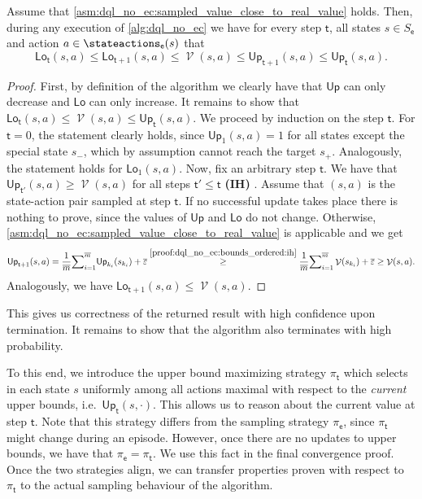 \documentclass{article}
\makeatletter
\newcommand{\States}{S}
\newcommand{\strategy}{\pi}
\DeclareMathOperator{\val}{\mathcal{V}}
\newcommand{\upperbound}{\mathsf{Up}}
\newcommand{\lowerbound}{\mathsf{Lo}}
\newcommand{\targetstate}{s_+}
\newcommand{\sinkstate}{s_-}
\newcommand{\updatestep}{{\overline{\varepsilon}}}
\newcommand{\delay}{{\overline{m}}}
\newcommand{\algostep}{\mathsf{t}}
\newcommand{\algoepisode}{\mathsf{e}}
\def\alabel#1#2{\begingroup
	\textbf{(#2)}\def\@currentlabel{\textbf{[#2]}}\phantomsection\label{#1}\endgroup
}
\makeatother
\begin{document}
\begin{lemma} \label{stm:dql_no_ec:bounds_ordered}
	Assume that \cref{asm:dql_no_ec:sampled_value_close_to_real_value} holds.
	Then, during any execution of \cref{alg:dql_no_ec} we have for every step $\algostep$, all states $s \in \States_\algoepisode$ and action $a \in \stateactions_\algoepisode(s)$ that
	\begin{equation*}
		\lowerbound_\algostep(s, a) \leq \lowerbound_{\algostep + 1}(s, a) \leq \val(s, a) \leq \upperbound_{\algostep + 1}(s, a) \leq \upperbound_\algostep(s, a).
	\end{equation*}
\end{lemma}

\begin{proof}
	First, by definition of the algorithm we clearly have that $\upperbound$ can only decrease and $\lowerbound$ can only increase.
	It remains to show that $\lowerbound_\algostep(s, a) \leq \val(s, a) \leq \upperbound_\algostep(s, a)$.
	We proceed by induction on the step $\algostep$.
	For $\algostep = 0$, the statement clearly holds, since $\upperbound_1(s, a) = 1$ for all states except the special state $\sinkstate$, which by assumption cannot reach the target $\targetstate$.
	Analogously, the statement holds for $\lowerbound_1(s, a)$.
	Now, fix an arbitrary step $\algostep$.
	We have that $\upperbound_{\algostep'}(s, a) \geq \val(s, a)$ for all steps $\algostep' \leq \algostep$ \alabel{proof:dql_no_ec:bounds_ordered:ih}{IH}.
	Assume that $(s, a)$ is the state-action pair sampled at step $\algostep$.
	If no successful update takes place there is nothing to prove, since the values of $\upperbound$ and $\lowerbound$ do not change.
	Otherwise, \cref{asm:dql_no_ec:sampled_value_close_to_real_value} is applicable and we get
	\begin{equation*}
		\upperbound_{\algostep + 1}(s, a) = \frac{1}{\delay} {\sum}_{i=1}^\delay \upperbound_{k_i}(s_{k_i}) + \updatestep \overset{\ref{proof:dql_no_ec:bounds_ordered:ih}}{\geq} \frac{1}{\delay} {\sum}_{i=1}^\delay \val(s_{k_i}) + \updatestep \geq \val(s, a).
	\end{equation*}
	Analogously, we have $\lowerbound_{\algostep + 1}(s, a) \leq \val(s, a)$. 
\end{proof}
This gives us correctness of the returned result with high confidence upon termination.
It remains to show that the algorithm also terminates with high probability.

To this end, we introduce the upper bound maximizing strategy $\strategy_\algostep$ which selects in each state $s$ uniformly among all actions maximal with respect to the \emph{current} upper bounds, i.e.\ $\upperbound_\algostep(s, \cdot)$.
This allows us to reason about the current value at step $\algostep$.
Note that this strategy differs from the sampling strategy $\strategy_\algoepisode$, since $\strategy_\algostep$ might change during an episode.
However, once there are no updates to upper bounds, we have that $\strategy_\algoepisode = \strategy_\algostep$.
We use this fact in the final convergence proof.
Once the two strategies align, we can transfer properties proven with respect to $\strategy_\algostep$ to the actual sampling behaviour of the algorithm.
\end{document}
